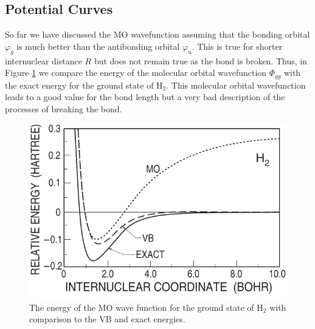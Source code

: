 \subsection{Potential Curves}
    
So far we have discussed the MO wavefunction assuming
that the bonding orbital $\varphi_g$ is much better than the
antibonding orbital $\varphi_u$. This is true for shorter internuclear
distance $R$ but does not remain true as the bond is broken. Thus, in
Figure \ref{fig2-23} we compare the energy of the molecular orbital
wavefunction $\Phi_{gg}$ with the exact energy for the ground state of
H$_2$. This molecular orbital wavefunction leads to a good value for
the bond length but a very bad description of the processes of
breaking the bond.

\begin{figure}
\includegraphics[scale=0.75]{fig2-27}
\caption{The energy of the MO wave function for the ground state of
  H$_2$ with comparison to the VB and exact energies.}
\label{fig2-23}
\end{figure}
    
